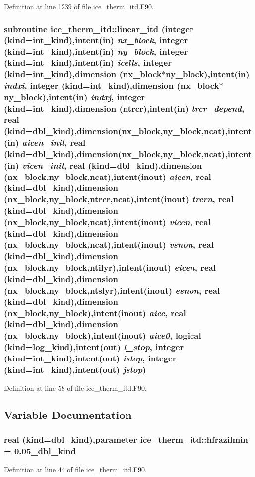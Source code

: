 Definition at line 1239 of file ice\_\-therm\_\-itd.F90.\hypertarget{namespaceice__therm__itd_acd44275babbe78e10bc9ddcbd1c631cd}{
\subsubsection[{linear\_\-itd}]{\setlength{\rightskip}{0pt plus 5cm}subroutine ice\_\-therm\_\-itd::linear\_\-itd (integer (kind=int\_\-kind),intent(in) {\em nx\_\-block}, \/  integer (kind=int\_\-kind),intent(in) {\em ny\_\-block}, \/  integer (kind=int\_\-kind),intent(in) {\em icells}, \/  integer (kind=int\_\-kind),dimension (nx\_\-block$\ast$ny\_\-block),intent(in) {\em indxi}, \/  integer (kind=int\_\-kind),dimension (nx\_\-block$\ast$ny\_\-block),intent(in) {\em indxj}, \/  integer (kind=int\_\-kind),dimension (ntrcr),intent(in) {\em trcr\_\-depend}, \/  real (kind=dbl\_\-kind),dimension(nx\_\-block,ny\_\-block,ncat),intent(in) {\em aicen\_\-init}, \/  real (kind=dbl\_\-kind),dimension(nx\_\-block,ny\_\-block,ncat),intent(in) {\em vicen\_\-init}, \/  real (kind=dbl\_\-kind),dimension (nx\_\-block,ny\_\-block,ncat),intent(inout) {\em aicen}, \/  real (kind=dbl\_\-kind),dimension (nx\_\-block,ny\_\-block,ntrcr,ncat),intent(inout) {\em trcrn}, \/  real (kind=dbl\_\-kind),dimension (nx\_\-block,ny\_\-block,ncat),intent(inout) {\em vicen}, \/  real (kind=dbl\_\-kind),dimension (nx\_\-block,ny\_\-block,ncat),intent(inout) {\em vsnon}, \/  real (kind=dbl\_\-kind),dimension (nx\_\-block,ny\_\-block,ntilyr),intent(inout) {\em eicen}, \/  real (kind=dbl\_\-kind),dimension (nx\_\-block,ny\_\-block,ntslyr),intent(inout) {\em esnon}, \/  real (kind=dbl\_\-kind),dimension (nx\_\-block,ny\_\-block),intent(inout) {\em aice}, \/  real (kind=dbl\_\-kind),dimension (nx\_\-block,ny\_\-block),intent(inout) {\em aice0}, \/  logical (kind=log\_\-kind),intent(out) {\em l\_\-stop}, \/  integer (kind=int\_\-kind),intent(out) {\em istop}, \/  integer (kind=int\_\-kind),intent(out) {\em jstop})}}
\label{namespaceice__therm__itd_acd44275babbe78e10bc9ddcbd1c631cd}


Definition at line 58 of file ice\_\-therm\_\-itd.F90.

\subsection{Variable Documentation}
\hypertarget{namespaceice__therm__itd_addb09aa25c77eb5ffb880aab7ddff915}{
\subsubsection[{hfrazilmin}]{\setlength{\rightskip}{0pt plus 5cm}real (kind=dbl\_\-kind),parameter {\bf ice\_\-therm\_\-itd::hfrazilmin} = 0.05\_\-dbl\_\-kind}}
\label{namespaceice__therm__itd_addb09aa25c77eb5ffb880aab7ddff915}


Definition at line 44 of file ice\_\-therm\_\-itd.F90.